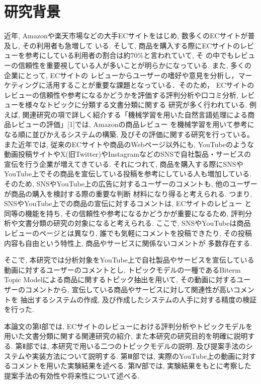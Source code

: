 \documentclass{ltjarticle}
\begin{document}
\section{研究背景}
近年, Amazonや楽天市場などの大手ECサイトをはじめ, 数多くのECサイトが普及し, その利用者も急増して
いる. そして, 商品を購入する際にECサイトのレビューを参考にしている利用者の割合は約70\%と言われていて, そ
の中でもレビューの信頼性を重要視している人が多いことが明らかになっている. また, 多くの企業にとって, ECサイトの
レビューからユーザーの嗜好や意見を分析し，マーケティングに活用することが重要な課題となっている．そのため，
ECサイトのレビューの信頼性や参考になるかどうかを評価する評判分析や口コミ分析, レビューを様々なトピックに分類する文書分類に関する
研究が多く行われている. 例えば, 関連研究の項で詳しく紹介する「機械学習を用いた自然言語処理による商品レビューの評価」[1]では, Amazonの商品レビュー
を機械学習を用いて参考になる順に並びかえるシステムの構築, 及びその評価に関する研究を行っている。
また近年では, 従来のECサイトや商品のWebページ以外にも, YouTubeのような
動画投稿サイトやX(旧Twitter)やInstagramなどのSNSで自社製品・サービスの宣伝を行う企業が増えてきている. 
それにつれて, 商品を購入する際にSNSやYouTube上でその商品を宣伝している投稿を参考にしている人も増加している. 
そのため, SNSやYouTube上の広告に対するユーザーのコメントも, 他のユーザーが商品の購入を検討する際の重要な判断
材料になり得ると考えられる. つまり, SNSやYouTube上での商品の宣伝に対するコメントは, ECサイトのレビュー
と同等の機能を持ち, その信頼性や参考になるかどうかが重要になるため, 
評判分析や文書分類の研究の対象になると考えられる. ここで, SNSやYouTubeは商品レビューのページとは異なり, 
誰でも気軽にコメントを投稿できたり, その投稿内容も自由という特性上, 商品やサービスに関係ないコメントが
多数存在する.

そこで, 本研究では分析対象をYouTube上で自社製品やサービスを宣伝している動画に対するユーザーのコメントとし, 
トピックモデルの一種であるBiterm Topic Modelによる商品に関するトピック抽出を用いて, 
その動画に対するユーザーのコメントから, 宣伝している商品やサービスに対して関連性が高いコメントを
抽出するシステムの作成, 及び作成したシステムの人手に対する精度の検証を行った. 

本論文の第Ⅰ部では, ECサイトのレビューにおける評判分析やトピックモデルを用いた文書分類に関する関連研究の紹介, 
また本研究の研究目的を明確に説明する.
第Ⅱ部では, 本研究で用いる二つのトピックモデルの説明, 及び提案手法のシステムや実装方法について説明する.
第Ⅲ部では, 実際のYouTube上の動画に対するコメントを用いた実験結果を述べる.
第Ⅳ部では, 実験結果をもとに考察した提案手法の有効性や将来性について述べる. 
\end{document}
